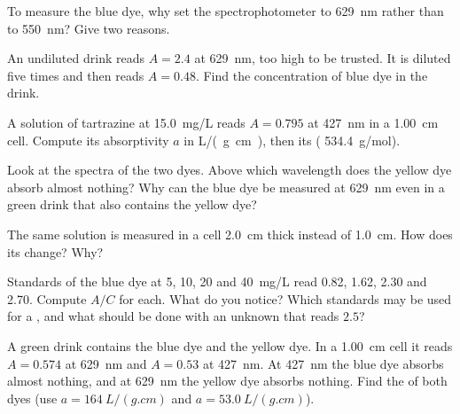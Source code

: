 \begin{exercise}[$\star\star$]\label{exo:g11:absorbance:7}
To measure the blue dye, why set the spectrophotometer to
\qty{629}{nm} rather than to \qty{550}{nm}? Give two reasons.
\end{exercise}

\begin{exercise}[$\star\star$]\label{exo:g11:absorbance:8}
An undiluted drink reads $A = 2.4$ at \qty{629}{nm}, too high to be
trusted. It is diluted five times and then reads $A = 0.48$. Find the
concentration of blue dye in the drink.
\end{exercise}

\begin{exercise}[$\star\star$]\label{exo:g11:absorbance:9}
A solution of tartrazine at \qty{15.0}{mg/L} reads $A = 0.795$ at
\qty{427}{nm} in a \qty{1.00}{cm} cell. Compute its absorptivity $a$ in
\si{L/(g.cm)}, then its  (
\qty{534.4}{g/mol}).
\end{exercise}

\begin{exercise}[$\star\star$]\label{exo:g11:absorbance:10}
Look at the spectra of the two dyes. Above which wavelength does the
yellow dye absorb almost nothing? Why can the blue dye be measured at
\qty{629}{nm} even in a green drink that also contains the yellow dye?
\end{exercise}

\begin{exercise}[$\star\star$]\label{exo:g11:absorbance:11}
The same solution is measured in a cell \qty{2.0}{cm} thick instead of
\qty{1.0}{cm}. How does its  change? Why?
\end{exercise}

\begin{exercise}[$\star\star\star$]\label{exo:g11:absorbance:12}
Standards of the blue dye at 5, 10, 20 and \qty{40}{mg/L} read 0.82, 1.62,
2.30 and 2.70. Compute $A / C$ for each. What do you notice? Which
standards may be used for a , and what should be done
with an unknown that reads $2.5$?
\end{exercise}

\begin{exercise}[$\star\star\star$]\label{exo:g11:absorbance:13}
A green drink contains the blue dye and the yellow dye. In a
\qty{1.00}{cm} cell it reads $A = 0.574$ at \qty{629}{nm} and $A = 0.53$
at \qty{427}{nm}. At \qty{427}{nm} the blue dye absorbs almost nothing,
and at \qty{629}{nm} the yellow dye absorbs nothing. Find the  of both dyes (use $a = \qty{164}{L/(g.cm)}$ and
$a = \qty{53.0}{L/(g.cm)}$).
\end{exercise}

